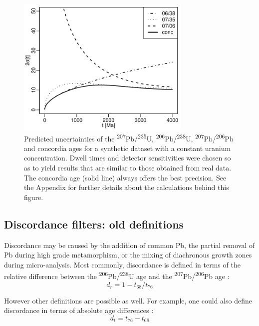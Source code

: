 \documentclass[gchron, manuscript]{copernicus}
\begin{document}
\begin{figure}[t]
  \includegraphics[width=8.3cm]{agerr.pdf}
  \caption{Predicted uncertainties of the
    \textsuperscript{207}Pb/\textsuperscript{235}U,
    \textsuperscript{206}Pb/\textsuperscript{238}U,
    \textsuperscript{207}Pb/\textsuperscript{206}Pb and concordia
    ages for a synthetic dataset with a constant uranium
    concentration. Dwell times and detector sensitivities were
    chosen so as to yield results that are similar to those obtained
    from real data. The concordia age (solid line) always offers the
    best precision. See the Appendix for further details about the
    calculations behind this figure.}
  \label{fig:precision}
\end{figure}

\subsection{Discordance filters: old definitions}\label{sec:discordance1}

Discordance may be caused by the addition of common Pb, the partial
removal of Pb during high grade metamorphism, or the mixing of
diachronous growth zones during micro-analysis. Most commonly,
discordance is defined in terms of the relative difference between the
\textsuperscript{206}Pb/\textsuperscript{238}U age and the
\textsuperscript{207}Pb/\textsuperscript{206}Pb age
\citep{gehrels2011}:
\begin{equation}
  d_r = 1 - t_{68}/t_{76}
  \label{eq:dr}
\end{equation}

However other definitions are possible as well. For example, one could
also define discordance in terms of absolute age differences
\citep{puetz2018}:
\begin{equation}
  d_t = t_{76} - t_{68}
  \label{eq:dt}
\end{equation}
\end{document}
